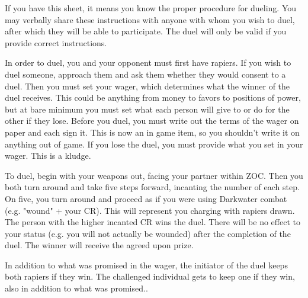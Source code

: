 \documentclass[green]{guildcamp4}
\begin{document}
\name{\gDuel{}}

If you have this sheet, it means you know the proper procedure for dueling. You may verbally share these instructions with anyone with whom you wish to duel, after which they will be able to participate. The duel will only be valid if you provide correct instructions.

In order to duel, you and your opponent must first have rapiers. If you wish to duel someone, approach them and ask them whether they would consent to a duel. Then you must set your wager, which determines what the winner of the duel receives. This could be anything from money to favors to positions of power, but at bare minimum you must set what each person will give to or do for the other if they lose. Before you duel, you must write out the terms of the wager on paper and each sign it. This is now an in game item, so you shouldn't write it on anything out of game. If you lose the duel, you must provide what you set in your wager. This is a kludge.

To duel, begin with your weapons out, facing your partner within ZOC. Then you both turn around and take five steps forward, incanting the number of each step. On five, you turn around and proceed as if you were using Darkwater combat (e.g. "wound" + your CR). This will represent you charging with rapiers drawn. The person with the higher incanted CR wins the duel. There will be no effect to your status (e.g. you will not actually be wounded) after the completion of the duel. The winner will receive the agreed upon prize.

In addition to what was promised in the wager, the initiator of the duel keeps both rapiers if they win. The challenged individual gets to keep one if they win, also in addition to what was promised..
\end{document}
